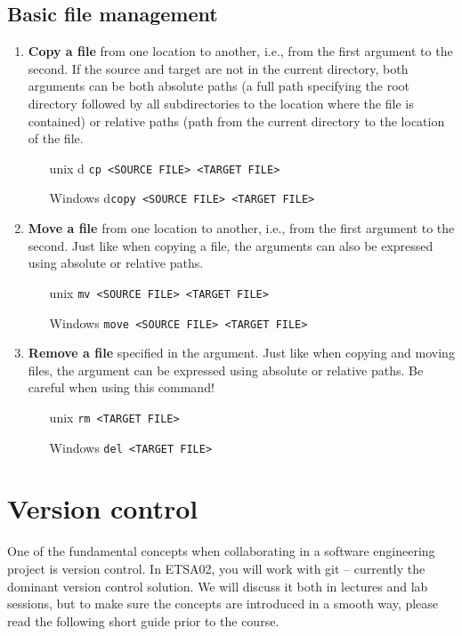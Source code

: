 \documentclass{scrreprt}
\begin{document}
\section{Basic file management}
\begin{enumerate}
\item \textbf{Copy a file} from one location to another, i.e., from the first argument to the second. If the source and target are not in the current directory, both arguments can be both absolute paths (a full path specifying  the root directory followed by all subdirectories to the location where the file is contained) or relative paths (path from the current directory to the location of the file.
\begin{itemize}
\item[unix]d \texttt{cp <SOURCE FILE> <TARGET FILE>}
\item[Windows] d\texttt{copy <SOURCE FILE> <TARGET FILE>}
\end{itemize}
\item \textbf{Move a file} from one location to another, i.e., from the first argument to the second. Just like when copying a file, the arguments can also be expressed using absolute or relative paths.
\begin{itemize}
\item[unix] \texttt{mv <SOURCE FILE> <TARGET FILE>}
\item[Windows] \texttt{move <SOURCE FILE> <TARGET FILE>}
\end{itemize}
\item \textbf{Remove a file} specified in the argument. Just like when copying and moving files, the argument can be expressed using absolute or relative paths. Be careful when using this command!
\begin{itemize}
\item[unix] \texttt{rm <TARGET FILE>}
\item[Windows] \texttt{del <TARGET FILE>}
\end{itemize}
\end{enumerate}

\chapter{Version control}
One of the fundamental concepts when collaborating in a software engineering project is version control. In ETSA02, you will work with git -- currently the dominant version control solution. We will discuss it both in lectures and lab sessions, but to make sure the concepts are introduced in a smooth way, please read the following short guide prior to the course.\\
\end{document}

